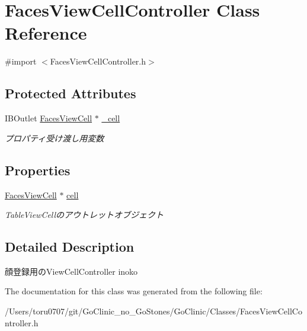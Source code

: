 \hypertarget{interface_faces_view_cell_controller}{
\section{FacesViewCellController Class Reference}
\label{interface_faces_view_cell_controller}
}


{\ttfamily \#import $<$FacesViewCellController.h$>$}

\subsection*{Protected Attributes}
\begin{DoxyCompactItemize}
\item 
\hypertarget{interface_faces_view_cell_controller_ac3c41a37bbba25bd20b72e3982da81b4}{
IBOutlet \hyperlink{interface_faces_view_cell}{FacesViewCell} $\ast$ \hyperlink{interface_faces_view_cell_controller_ac3c41a37bbba25bd20b72e3982da81b4}{\_\-cell}}
\label{interface_faces_view_cell_controller_ac3c41a37bbba25bd20b72e3982da81b4}

\begin{DoxyCompactList}\small\item\em プロパティ受け渡し用変数 \end{DoxyCompactList}\end{DoxyCompactItemize}
\subsection*{Properties}
\begin{DoxyCompactItemize}
\item 
\hypertarget{interface_faces_view_cell_controller_a731d8597ceca6ecac818a0d355fd29a5}{
\hyperlink{interface_faces_view_cell}{FacesViewCell} $\ast$ \hyperlink{interface_faces_view_cell_controller_a731d8597ceca6ecac818a0d355fd29a5}{cell}}
\label{interface_faces_view_cell_controller_a731d8597ceca6ecac818a0d355fd29a5}

\begin{DoxyCompactList}\small\item\em TableViewCellのアウトレットオブジェクト \end{DoxyCompactList}\end{DoxyCompactItemize}


\subsection{Detailed Description}
顔登録用のViewCellController  inoko 

The documentation for this class was generated from the following file:\begin{DoxyCompactItemize}
\item 
/Users/toru0707/git/GoClinic\_\-no\_\-GoStones/GoClinic/Classes/FacesViewCellController.h\end{DoxyCompactItemize}
